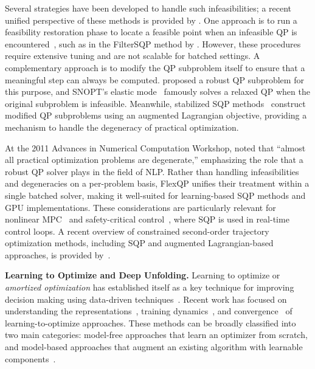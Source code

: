 \documentclass{article} %
\begin{document}
Several strategies have been developed to handle such infeasibilities; a recent unified perspective of these methods is provided by \citet{Kiessling2025Unified}.
One approach is to run a feasibility restoration phase to locate a feasible point when an infeasible QP is encountered~\citep{nocedal2006numerical}, such as in the FilterSQP method by \citet{Fletcher2002Nonlinear}.
However, these procedures require extensive tuning and are not scalable for batched settings.
A complementary approach is to modify the QP subproblem itself to ensure that a meaningful step can always be computed.
\citet{Burke1989Robust} proposed a robust QP subproblem for this purpose, and SNOPT's elastic mode~\citep{gill2005snopt} famously solves a relaxed QP when the original subproblem is infeasible.
Meanwhile, stabilized SQP methods~\citep{wright1998superlinear,hager1999stabilized,izmailov2012stabilized} construct modified QP subproblems using an augmented Lagrangian objective, providing a mechanism to handle the degeneracy of practical optimization.

At the 2011 Advances in Numerical Computation Workshop, \citet{Gill2011Active} noted that ``almost all practical optimization problems are degenerate,'' emphasizing the role that a robust QP solver plays in the field of NLP.
Rather than handling infeasibilities and degeneracies on a per-problem basis, FlexQP unifies their treatment within a single batched solver, making it well-suited for learning-based SQP methods and GPU implementations.
These considerations are particularly relevant for nonlinear MPC~\citep{diehl2009efficient,rawlings2020model} and safety-critical control~\citep{ames2019control,wabersich2021predictive}, where SQP is used in real-time control loops.
A recent overview of constrained second-order trajectory optimization methods, including SQP and augmented Lagrangian-based approaches, is provided by~\citet{aoyama2024second}.


\textbf{Learning to Optimize and Deep Unfolding.}
Learning to optimize or \emph{amortized optimization} has established itself as a key technique for improving decision making using data-driven techniques~\citep{chen2022learning,amos2023tutorial}.
Recent work has focused on understanding the representations~\citep{Liu2023Towards}, training dynamics~\citep{Metz2019Understanding,Scieur2022Curse}, and convergence~\citep{Sucker2025Generalization} of learning-to-optimize approaches.
These methods can be broadly classified into two main categories: model-free approaches that learn an optimizer from scratch, and model-based approaches that augment an existing algorithm with learnable components~\citep{Schlezinger2023ModelBased}.
\end{document}
